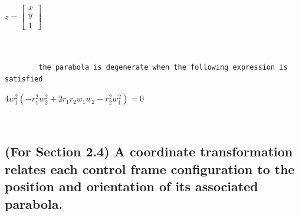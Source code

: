 \documentclass[11pt]{article}
\begin{document}
            
            $\displaystyle z = \left[\begin{matrix}x\\y\\1\end{matrix}\right]$

            
            \begin{Verbatim}[commandchars=\\\{\}]


        the parabola is degenerate when the following expression is satisfied
            \end{Verbatim}

            $\displaystyle 4 w_{1}^{2} \left(- r_{1}^{2} w_{2}^{2} + 2 r_{1} r_{2} w_{1} w_{2} - r_{2}^{2} w_{1}^{2}\right) = 0$

            
            \begin{Verbatim}[commandchars=\\\{\}]


            \end{Verbatim}

    \subsection{(For Section 2.4) A coordinate transformation relates each control frame configuration to the position and orientation of its associated parabola.}\label{a-coordinate-transformation-relates-each-control-frame-configuration-to-the-position-and-orientation-of-its-associated-parabola.}
\end{document}
